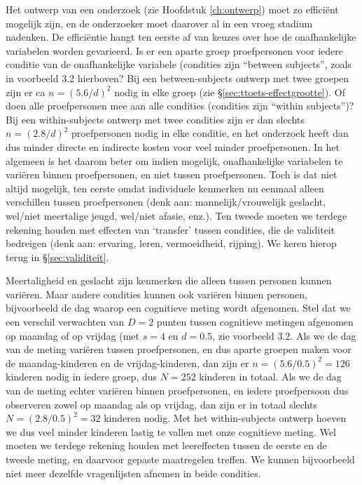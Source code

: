 \documentclass[
]{book}
\begin{document}
Het ontwerp van een onderzoek (zie
Hoofdstuk \ref{ch:ontwerp}) moet zo efficiënt mogelijk zijn, en de
onderzoeker moet daarover al in een vroeg stadium nadenken. De
efficiëntie hangt ten eerste af van keuzes over hoe de onafhankelijke
variabelen worden gevarieerd. Is er een aparte groep proefpersonen voor
iedere conditie van de onafhankelijke variabele (condities zijn ``between
subjects'', zoals in voorbeeld 3.2 hierboven? Bij een between-subjects
ontwerp met twee groepen zijn er ca \(n=(5.6/d)^2\) nodig in elke groep \citep{Gelm07}
(zie §\ref{sec:ttoets-effectgrootte}). Of doen alle proefpersonen mee
aan alle condities (condities zijn ``within subjects'')? Bij een
within-subjects ontwerp met twee condities zijn er dan slechts
\(n=(2.8/d)^2\) proefpersonen nodig in elke conditie, en het onderzoek
heeft dan dus minder directe en indirecte kosten voor veel minder
proefpersonen. In het algemeen is het daarom beter om indien mogelijk,
onafhankelijke variabelen te variëren binnen proefpersonen, en niet
tussen proefpersonen. Toch is dat niet altijd mogelijk, ten eerste omdat
individuele kenmerken nu eenmaal alleen verschillen tussen proefpersonen
(denk aan: mannelijk/vrouwelijk geslacht, wel/niet meertalige jeugd,
wel/niet afasie, enz.). Ten tweede moeten we terdege rekening houden met
effecten van `transfer' tussen condities, die de validiteit bedreigen
(denk aan: ervaring, leren, vermoeidheid, rijping). We keren hierop
terug in §\ref{sec:validiteit}.

Meertaligheid en geslacht zijn kenmerken die alleen tussen personen
kunnen variëren. Maar andere condities kunnen ook variëren binnen
personen, bijvoorbeeld de dag waarop een cognitieve meting wordt
afgenomen. Stel dat we een verschil verwachten van \(D=2\) punten tussen
cognitieve metingen afgenomen op maandag of op vrijdag (met \(s=4\) en
\(d=0.5\), zie voorbeeld 3.2. Als we de dag van de meting variëren
tussen proefpersonen, en dus aparte groepen maken voor de
maandag-kinderen en de vrijdag-kinderen, dan zijn er \(n=(5.6/0.5)^2=126\)
kinderen nodig in iedere groep, dus \(N=252\) kinderen in totaal. Als we
de dag van de meting echter variëren binnen proefpersonen, en iedere
proefpersoon dus observeren zowel op maandag als op vrijdag, dan zijn er
in totaal slechts \(N=(2.8/0.5)^2=32\) kinderen nodig. Met het
within-subjects ontwerp hoeven we dus veel minder kinderen lastig te
vallen met onze cognitieve meting. Wel moeten we terdege rekening houden
met leereffecten tussen de eerste en de tweede meting, en daarvoor
gepaste maatregelen treffen. We kunnen bijvoorbeeld niet meer dezelfde
vragenlijsten afnemen in beide condities.
\end{document}
